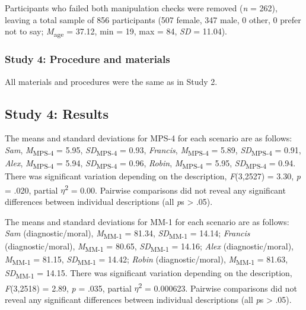 \documentclass[
  english,
  man,floatsintext]{apa7}
\begin{document}
Participants who failed both manipulation checks were removed (\emph{n} = 262), leaving a total sample of 856 participants (507 female, 347 male, 0 other, 0 prefer not to say; \emph{M}\textsubscript{age} = 37.12, min = 19, max = 84, \emph{SD} = 11.04).

\hypertarget{study-4-procedure-and-materials}{%
\subsubsection{Study 4: Procedure and materials}\label{study-4-procedure-and-materials}}

All materials and procedures were the same as in Study 2.

\hypertarget{study-4-results}{%
\subsection{Study 4: Results}\label{study-4-results}}

The means and standard deviations for MPS-4 for each scenario are as follows:
\emph{Sam},
\emph{M}\textsubscript{MPS-4} = 5.95, \emph{SD}\textsubscript{MPS-4} = 0.93,
\emph{Francis},
\emph{M}\textsubscript{MPS-4} = 5.89, \emph{SD}\textsubscript{MPS-4} = 0.91,
\emph{Alex},
\emph{M}\textsubscript{MPS-4} = 5.94, \emph{SD}\textsubscript{MPS-4} = 0.96,
\emph{Robin},
\emph{M}\textsubscript{MPS-4} = 5.95, \emph{SD}\textsubscript{MPS-4} = 0.94. There was significant variation depending on the description, \emph{F}(3,2527) = 3.30, \emph{p} = .020, partial \(\eta\)\textsuperscript{2} = 0.00. Pairwise comparisons did not reveal any significant differences between individual descriptions (all \emph{p}s \textgreater{} .05).

The means and standard deviations for MM-1 for each scenario are as follows:
\emph{Sam} (diagnostic/moral),
\emph{M}\textsubscript{MM-1} = 81.34, \emph{SD}\textsubscript{MM-1} = 14.14;
\emph{Francis} (diagnostic/moral),
\emph{M}\textsubscript{MM-1} = 80.65, \emph{SD}\textsubscript{MM-1} = 14.16;
\emph{Alex} (diagnostic/moral),
\emph{M}\textsubscript{MM-1} = 81.15, \emph{SD}\textsubscript{MM-1} = 14.42;
\emph{Robin} (diagnostic/moral),
\emph{M}\textsubscript{MM-1} = 81.63, \emph{SD}\textsubscript{MM-1} = 14.15. There was significant variation depending on the description, \emph{F}(3,2518) = 2.89, \emph{p} = .035, partial \(\eta\)\textsuperscript{2} = 0.000623. Pairwise comparisons did not reveal any significant differences between individual descriptions (all \emph{p}s \textgreater{} .05).
\end{document}
